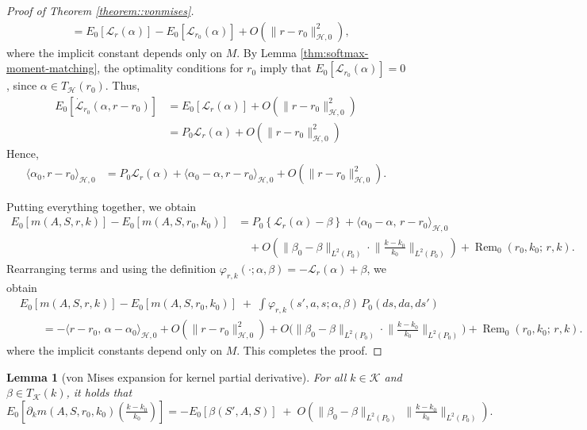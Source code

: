 \documentclass[11pt]{article}
\theoremstyle{plain}
\newtheorem{lemma}[theorem]{Lemma}
\begin{document}
\begin{proof}[Proof of Theorem \ref{theorem::vonmises}]
\begin{align*}
 &= E_0[\mathcal L_{r}(\alpha)] - E_0[\mathcal L_{r_0}(\alpha)]  + O(\|r - r_0\|_{\mathcal{H}, 0}^2),
\end{align*}
where the implicit constant depends only on $M$. By Lemma \ref{thm:softmax-moment-matching}, the optimality conditions for $r_0$ imply that $E_0[\mathcal L_{r_0}(\alpha)] = 0$, since $\alpha \in T_{\mathcal{H}}(r_0)$. Thus,
\begin{align*}
 E_0[\dot{\mathcal{L}}_{r_0}(\alpha, r - r_0)] &= E_0[\mathcal L_{r}(\alpha)]  + O(\|r - r_0\|_{\mathcal{H}, 0}^2) \\
 &= P_0 \mathcal L_{r}(\alpha)  + O(\|r - r_0\|_{\mathcal{H}, 0}^2)
\end{align*}
Hence, 
\begin{align*}
   \langle \alpha_0, r - r_0 \rangle_{\mathcal{H}, 0} &=  P_0 \mathcal L_{r}(\alpha) +  \langle \alpha_0 - \alpha, r - r_0 \rangle_{\mathcal{H}, 0}  + O(\|r - r_0\|_{\mathcal{H}, 0}^2).
\end{align*}


Putting everything together, we obtain
\begin{align*}
    E_0[m(A,S,r,k)] - E_0[m(A,S,r_0,k_0)] 
    &= P_0\!\left\{\mathcal{L}_{r}(\alpha) - \beta\right\}  
    + \langle \alpha_0 - \alpha,\, r - r_0 \rangle_{\mathcal{H}, 0}  \\
    &\quad + O\!\left(\|\beta_0
    - \beta\|_{L^2(P_0)} 
    \cdot \Big\|\tfrac{k-k_0}{k_0}\Big\|_{L^2(P_0)}\right) 
    + \operatorname{Rem}_0(r_0,k_0;\,r,k).
\end{align*}
Rearranging terms and using the definition 
$\varphi_{r,k}(\cdot;\alpha,\beta) = -\mathcal{L}_{r}(\alpha) + \beta$, we obtain
\begin{align*}
&E_0[m(A,S,r,k) ]- E_0[m(A,S,r_0,k_0)] 
\;+\; \int \varphi_{r,k}(s',a,s;\alpha,\beta)\, P_0(ds,da,ds') \\
 & \qquad   = -\langle r - r_0,\, \alpha - \alpha_0 \rangle_{\mathcal{H}, 0}  + O(\|r - r_0\|_{\mathcal{H},0}^2) 
   + O\!\Big(\|\beta_0
    - \beta\|_{L^2(P_0)} 
    \cdot \Big\|\tfrac{k-k_0}{k_0}\Big\|_{L^2(P_0)}\Big) + \operatorname{Rem}_0(r_0,k_0;\,r,k).
\end{align*}
where the implicit constants depend only on $M$.
This completes the proof.



\end{proof}




\begin{lemma}[von Mises expansion for kernel partial derivative]
\label{lemma::vonmiseskernel}
For all $k \in \mathcal{K}$ and $\beta \in T_{\mathcal K}(k)$, it holds that
\[
E_0\!\left[\partial_k m(A,S,r_0,k_0)\!\left(\tfrac{k - k_0}{k_0}\right)\right] 
=  - E_0[\beta(S',A,S)] 
\;+\; O\!\left(\|\beta_0
- \beta\|_{L^2(P_0)} \;
   \Big\|\tfrac{k-k_0}{k_0}\Big\|_{L^2(P_0)}\right).
\]
\end{lemma}
\end{document}
